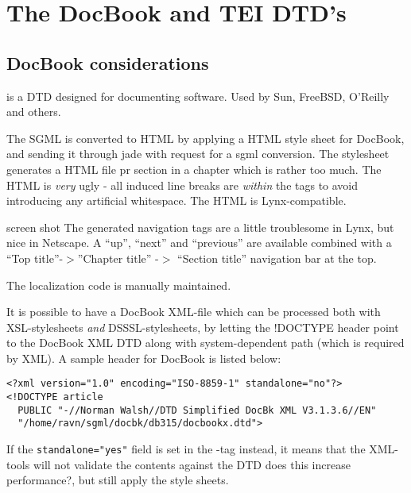 
\chapter{The DocBook and TEI DTD's}


\section{DocBook considerations}


 is a DTD designed for
documenting software.  Used by Sun, FreeBSD, O'Reilly and others.


\textsf{
The SGML is converted to HTML by applying a HTML style sheet for
DocBook, and sending it through jade with request for a sgml
conversion.  The stylesheet generates a HTML file pr section in a
chapter which is rather too much.  The HTML is \textit{very} ugly - all
induced line breaks are \textit{within} the tags to avoid introducing any
artificial whitespace.  The HTML is Lynx-compatible.
}

\textsf{screen shot}
The generated navigation tags are a little troublesome in Lynx, but
nice in Netscape.  A ``up'', ``next'' and ``previous'' are available
combined with a ``Top title''-$>$''Chapter title'' -$>$ ``Section title''
navigation bar at the top.

The localization code is manually maintained.

It is possible to have a DocBook XML-file which can be processed both
with XSL-stylesheets \textit{and} DSSSL-stylesheets, by letting the
!DOCTYPE header point to the DocBook XML DTD along with
system-dependent path (which is required by XML).  A sample header for
DocBook is listed below:

\begin{verbatim}
<?xml version="1.0" encoding="ISO-8859-1" standalone="no"?>
<!DOCTYPE article 
  PUBLIC "-//Norman Walsh//DTD Simplified DocBk XML V3.1.3.6//EN" 
  "/home/ravn/sgml/docbk/db315/docbookx.dtd">
\end{verbatim}

If the \texttt{standalone="yes"} field is set in the -tag
instead, it means that the XML-tools will not validate the contents
against the DTD \textsf{does this increase performance?}, but still
apply the style sheets.

